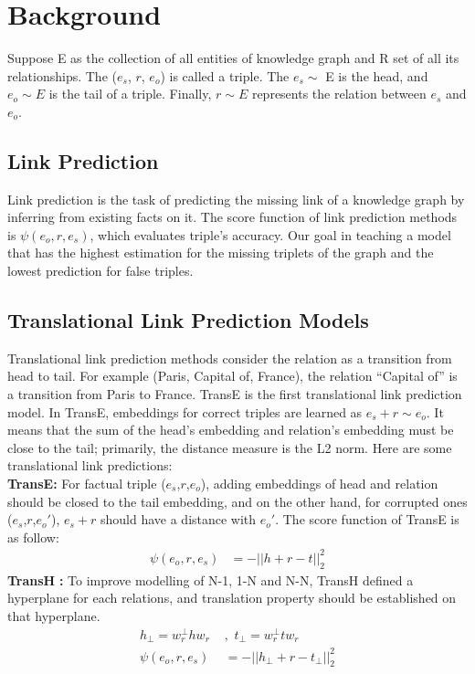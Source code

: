 \documentclass{article} \usepackage{iclr2022_conference,times}
\begin{document}
\section{Background}
\label{gen_inst}
\noindent Suppose E as the collection of all entities of knowledge graph and R set of all its relationships. The ($e_s$, $r$, $e_o$) is called a triple. The $e_s \sim$ E is the head, and $e_o \sim E$ is the tail of a triple. Finally, $r \sim E$ represents the relation between $e_s$ and $e_o$.
\subsection{Link Prediction}
Link prediction is the task of predicting the missing link of a knowledge graph by inferring from existing facts on it. The score function of link prediction methods is $\psi(e_o, r, e_s)$, which evaluates triple's accuracy. Our goal in teaching a model that has the highest estimation for the missing triplets of the graph and the lowest prediction for false triples.
\subsection{Translational Link Prediction Models}
Translational link prediction methods consider the relation as a transition from head to tail. For example (Paris, Capital of, France), the relation ``Capital of'' is a transition from Paris to France. TransE \citep{bordes2013translating} is the first translational link prediction model. In TransE, embeddings for correct triples are learned as $e_s + r \sim e_o$. It means that the sum of the head's embedding and relation's embedding must be close to the tail; primarily, the distance measure is the L2 norm.
Here are some translational link predictions:\\

\noindent \textbf{TransE:}
For factual triple ($e_s$,$r$,$e_o$), adding embeddings of head and relation should be closed to the tail embedding, and on the other hand, for corrupted ones ($e_s$,$r$,$e_o\prime$),  $e_s +  r$ should have a distance with $e_o\prime$. The score function of TransE is as follow: 
\begin{align*}
    \psi(e_o, r, e_s) &= -|| h + r - t ||^2_2
\end{align*}
\noindent \textbf{TransH} \citep{transh}\textbf{:}
To improve modelling of N-1, 1-N and N-N, TransH defined a hyperplane for each relations, and translation property should be established on that hyperplane.
\begin{align*}
    h_ \bot = w^ \bot_r hw_r \,\, &,\,\, t_ \bot = w^ \bot_r tw_r \\
    \psi(e_o, r, e_s) &= -|| h_ \bot + r - t_ \bot ||^2_2
\end{align*}
\end{document}
